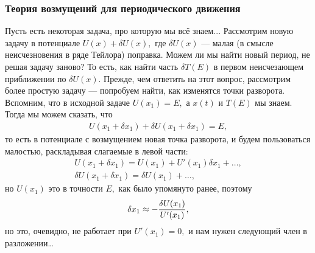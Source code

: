 \subsubsection{Теория возмущений для периодического движения}
Пусть есть некоторая задача, про которую мы всё знаем...
Рассмотрим новую задачу в потенциале $U(x)  + \delta U(x),$ где $\delta U(x)$ --- малая (в смысле неисчезновения в ряде Тейлора) поправка. Можем ли мы найти новый период, не решая задачу заново? То есть, как найти часть $\delta T(E)$ в первом неисчезающем приближении по $\delta U(x)$. Прежде, чем ответить на этот вопрос, рассмотрим более простую задачу --- попробуем найти, как изменятся точки разворота. Вспомним, что в исходной задаче $U(x_1) = E,$ а $x(t)$ и $T(E)$ мы знаем. Тогда мы можем сказать, что 
\begin{gather}
U(x_1 + \delta x_1) + \delta U(x_1 + \delta x_1) = E,
\end{gather}
то есть в потенциале с возмущением новая точка разворота, и будем пользоваться малостью, раскладывая слагаемые в левой части:
\begin{gather}
U(x_1 + \delta x_1) = U(x_1) + U'(x_1) \delta x_1 + \ldots,\\
\delta U(x_1 + \delta x_1) = \delta U(x_1) + \ldots,
\end{gather}
но $U(x_1)$ это в точности $E,$ как было упомянуто ранее, поэтому 
\begin{equation}
\var{x_1} \approx - \frac{\var{U(x_1)}}{U'(x_1)},
\end{equation}
но это, очевидно, не работает при $U'(x_1) = 0,$ и нам нужен следующий член в разложении\dots

